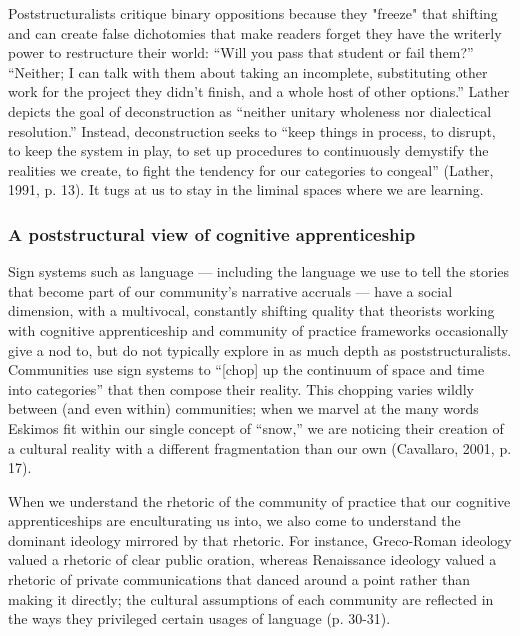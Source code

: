 Poststructuralists critique binary oppositions because they "freeze" that shifting and can create false dichotomies that make readers forget they have the writerly power to restructure their world: “Will you pass that student or fail them?” “Neither; I can talk with them about taking an incomplete, substituting other work for the project they didn’t finish, and a whole host of other options.” Lather depicts the goal of deconstruction as “neither unitary wholeness nor dialectical resolution.” Instead, deconstruction seeks to “keep things in process, to disrupt, to keep the system in play, to set up procedures to continuously demystify the realities we create, to fight the tendency for our categories to congeal” (Lather, 1991, p. 13). It tugs at us to stay in the liminal spaces where we are learning.

\subsubsection{A poststructural view of cognitive apprenticeship}

Sign systems such as language — including the language we use to tell the stories that become part of our community’s narrative accruals — have a social dimension, with a multivocal, constantly shifting quality that theorists working with cognitive apprenticeship and community of practice frameworks occasionally give a nod to, but do not typically explore in as much depth as poststructuralists. Communities use sign systems to “[chop] up the continuum of space and time into categories” that then compose their reality. This chopping varies wildly between (and even within) communities; when we marvel at the many words Eskimos fit within our single concept of “snow,” we are noticing their creation of a cultural reality with a different fragmentation than our own (Cavallaro, 2001, p. 17).

When we understand the rhetoric of the community of practice that our cognitive apprenticeships are enculturating us into, we also come to understand the dominant ideology mirrored by that rhetoric. For instance, Greco-Roman ideology valued a rhetoric of clear public oration, whereas Renaissance ideology valued a rhetoric of private communications that danced around a point rather than making it directly; the cultural assumptions of each community are reflected in the ways they privileged certain usages of language (p. 30-31).

